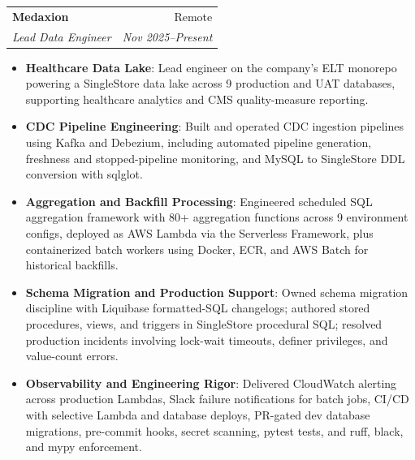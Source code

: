 \documentclass[letterpaper,11pt]{article}
\makeatletter
\newcommand{\resumeItem}[2]{
  \item\small{
    \textbf{#1}{: #2 \vspace{-2pt}}
  }
}
\newcommand{\resumeSubheading}[4]{
  \vspace{-1pt}\item
    \begin{tabular*}{0.97\textwidth}[t]{l@{\extracolsep{\fill}}r}
      \textbf{#1} & #2 \\
      \textit{\small#3} & \textit{\small #4} \\
    \end{tabular*}\vspace{-5pt}
}
\newcommand{\resumeItemListStart}{\begin{itemize}}
\newcommand{\resumeItemListEnd}{\end{itemize}\vspace{-5pt}}
\makeatother
\begin{document}
    \resumeSubheading
      {Medaxion}{Remote}
      {Lead Data Engineer}{Nov 2025--Present}
      \resumeItemListStart
        \resumeItem{Healthcare Data Lake}
          {Lead engineer on the company's ELT monorepo powering a SingleStore data lake across 9 production and UAT databases, supporting healthcare analytics and CMS quality-measure reporting.}
        \resumeItem{CDC Pipeline Engineering}
          {Built and operated CDC ingestion pipelines using Kafka and Debezium, including automated pipeline generation, freshness and stopped-pipeline monitoring, and MySQL to SingleStore DDL conversion with sqlglot.}
        \resumeItem{Aggregation and Backfill Processing}
          {Engineered scheduled SQL aggregation framework with 80+ aggregation functions across 9 environment configs, deployed as AWS Lambda via the Serverless Framework, plus containerized batch workers using Docker, ECR, and AWS Batch for historical backfills.}
        \resumeItem{Schema Migration and Production Support}
          {Owned schema migration discipline with Liquibase formatted-SQL changelogs; authored stored procedures, views, and triggers in SingleStore procedural SQL; resolved production incidents involving lock-wait timeouts, definer privileges, and value-count errors.}
        \resumeItem{Observability and Engineering Rigor}
          {Delivered CloudWatch alerting across production Lambdas, Slack failure notifications for batch jobs, CI/CD with selective Lambda and database deploys, PR-gated dev database migrations, pre-commit hooks, secret scanning, pytest tests, and ruff, black, and mypy enforcement.}
      \resumeItemListEnd
\end{document}
